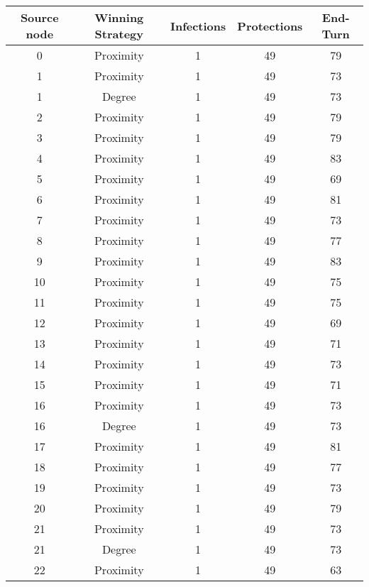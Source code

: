 \documentclass[results.tex]{subfiles}
\begin{document}
\begin{center}
  \begin{tabular}{| c || c | c | c | c |}
    \hline
    {\bfseries Source node} & {\bfseries Winning Strategy} & {\bfseries Infections} & {\bfseries Protections} & {\bfseries End-Turn} \\  %
    \hline\hline
    0 & Proximity & 1 & 49 & 79 \\ 
    \hline
    1 & Proximity & 1 & 49 & 73 \\ 
    \hline
    1 & Degree & 1 & 49 & 73 \\ 
    \hline
    2 & Proximity & 1 & 49 & 79 \\ 
    \hline
    3 & Proximity & 1 & 49 & 79 \\ 
    \hline
    4 & Proximity & 1 & 49 & 83 \\ 
    \hline
    5 & Proximity & 1 & 49 & 69 \\ 
    \hline
    6 & Proximity & 1 & 49 & 81 \\ 
    \hline
    7 & Proximity & 1 & 49 & 73 \\ 
    \hline
    8 & Proximity & 1 & 49 & 77 \\ 
    \hline
    9 & Proximity & 1 & 49 & 83 \\ 
    \hline
    10 & Proximity & 1 & 49 & 75 \\ 
    \hline
    11 & Proximity & 1 & 49 & 75 \\ 
    \hline
    12 & Proximity & 1 & 49 & 69 \\ 
    \hline
    13 & Proximity & 1 & 49 & 71 \\ 
    \hline
    14 & Proximity & 1 & 49 & 73 \\ 
    \hline
    15 & Proximity & 1 & 49 & 71 \\ 
    \hline
    16 & Proximity & 1 & 49 & 73 \\ 
    \hline
    16 & Degree & 1 & 49 & 73 \\ 
    \hline
    17 & Proximity & 1 & 49 & 81 \\ 
    \hline
    18 & Proximity & 1 & 49 & 77 \\ 
    \hline
    19 & Proximity & 1 & 49 & 73 \\ 
    \hline
    20 & Proximity & 1 & 49 & 79 \\ 
    \hline
    21 & Proximity & 1 & 49 & 73 \\ 
    \hline
    21 & Degree & 1 & 49 & 73 \\ 
    \hline
    22 & Proximity & 1 & 49 & 63 \\ 

\end{tabular}
\end{center}
\end{document}
